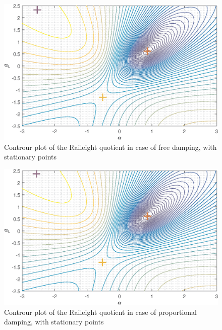 \documentclass[twosided,a4paper]{article}           %
\begin{document}
\begin{itemize}
\begin{figure}[H]
	\centering
	\includegraphics[width=\linewidth]{img/contour_f}
	\caption{Controur plot of the Raileight quotient in case of free damping, with stationary points}
	\label{fig:contour_f}
\end{figure}
\begin{figure}[H]
	\centering
	\includegraphics[width=\linewidth]{img/contour_p}
	\caption{Controur plot of the Raileight quotient in case of proportional damping, with stationary points}
	\label{fig:contour_p}
\end{figure}

	
\end{itemize}
	
\end{document}
